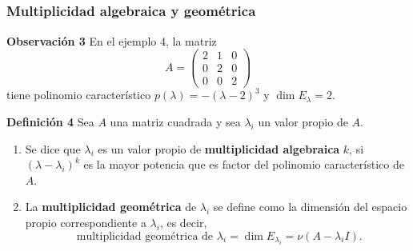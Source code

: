 
\subsection{}

{\nologo 
\begin{frame}\frametitle{Multiplicidad algebraica y geométrica}	
	
	\vspace{-2mm}	
	\begin{alertblock}{\textbf{Observación 3}}
		En el ejemplo 4, la matriz
		\[
		A =
		\left(
		\begin{array}{rrr}
		2 & 1 &  0\\[1mm]
		0 & 2 &  0\\[1mm]
		0 & 0 & 2
		\end{array}
		\right)
		\]	
		tiene polinomio característico $p(\lambda) = -(\lambda-2)^3$ y $\dim E_{\lambda}=2$.
	\end{alertblock}
	
	\begin{defi}{\textbf{Definición 4}}\justifying
		Sea $A$ una matriz cuadrada y sea $\lambda_i$ un valor propio de $A$.
		\begin{enumerate}[$a$]\justifying 
			\item Se dice que $\lambda_i$ es un valor propio de \textbf{multiplicidad algebraica} $k$, si $(\lambda-\lambda_i)^k$ es la mayor potencia que es factor del polinomio característico de $A$.
			\item La \textbf{multiplicidad geométrica} de $\lambda_i$ se define como la dimensión del espacio propio correspondiente a $\lambda_i$, es decir,
			\[
				\text{ multiplicidad geométrica de } \lambda_i = \dim E_{\lambda_i} = \nu(A-\lambda_i I).
			\]
		\end{enumerate}				
	\end{defi}	
	
\end{frame}
}


\subsection{}

